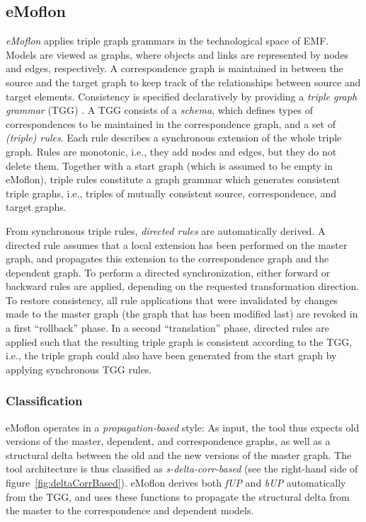 \subsection{eMoflon}
\label{sec:eMoflon}


\emph{eMoflon} \cite{Leblebici2014a} applies triple graph grammars in the technological space of EMF.
Models are viewed as graphs, where objects and links are represented by nodes and edges, respectively.
A correspondence graph is maintained in between the source and the target graph to keep track of the relationships between source and target elements.
Consistency is specified declaratively by providing a \emph{triple graph grammar} (TGG) \cite{Schurr1994}.
A TGG consists of a \emph{schema}, which defines types of correspondences to be maintained in the correspondence graph, and a set of \emph{(triple) rules}. Each rule describes a synchronous extension of the whole triple graph. Rules are monotonic, i.e., they add nodes and edges, but they do not delete them. Together with a start graph (which is assumed to be empty in eMoflon), triple rules constitute a graph grammar which generates consistent triple graphs, i.e., triples of mutually consistent source, correspondence, and target graphs.

From synchronous triple rules, \emph{directed rules} are automatically derived.
A directed rule assumes that a local extension has been performed on the master graph, and propagates this extension to the correspondence graph and the dependent graph.
To perform a directed synchronization, either forward or backward rules are applied, depending on the requested transformation direction.
To restore consistency, all rule applications that were invalidated by changes made to the master graph (the graph that has been modified last) are revoked in a first ``rollback'' phase.
In a second ``translation'' phase, directed rules are applied such that the resulting triple graph is consistent according to the TGG, i.e., the triple graph could also have been generated from the start graph by applying synchronous TGG rules.   

\subsubsection{Classification}
\label{sec:ClassificationEMoflon}

eMoflon operates in a \emph{propagation-based} style: As input, the tool thus expects old versions of the master, dependent, and correspondence graphs, as well as a structural delta between the old and the new versions of the master graph.
The tool architecture is thus classified as \emph{s-delta-corr-based} (see the right-hand side of figure~\ref{fig:deltaCorrBased}).
eMoflon derives both \emph{fUP} and \emph{bUP} automatically from the TGG, and uses these functions to propagate the structural delta from the master to the correspondence and dependent models.

